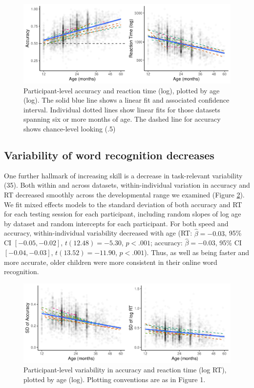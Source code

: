 \documentclass[9pt,twocolumn,twoside,]{pnas-new}
\begin{document}
\begin{figure}
\includegraphics{paper_files/figure-latex/devchange-1} \caption{Participant-level accuracy and reaction time (log), plotted by age (log). The solid blue line shows a linear fit and associated confidence interval. Individual dotted lines show linear fits for those datasets spanning six or more months of age. The dashed line for accuracy shows chance-level looking (.5)}\label{fig:devchange}
\end{figure}

\subsection*{Variability of word recognition
decreases}\label{variability-of-word-recognition-decreases}

One further hallmark of increasing skill is a decrease in task-relevant
variability (35). Both within and across datasets, within-individual
variation in accuracy and RT decreased smoothly across the developmental
range we examined (Figure \ref{fig:variance}). We fit mixed effects
models to the standard deviation of both accuracy and RT for each
testing session for each participant, including random slopes of log age
by dataset and random intercepts for each participant. For both speed
and accuracy, within-individual variability decreased with age (RT:
\(\hat{\beta} = -0.03\), 95\% CI \([-0.05, -0.02]\),
\(t(12.48) = -5.30\), \(p < .001\); accuracy: \(\hat{\beta} = -0.03\),
95\% CI \([-0.04, -0.03]\), \(t(13.52) = -11.90\), \(p < .001\)). Thus,
as well as being faster and more accurate, older children were more
consistent in their online word recognition.

\begin{figure}
\includegraphics{paper_files/figure-latex/variance-1} \caption{Participant-level variability in accuracy and reaction time (log RT), plotted by age (log). Plotting conventions are as in Figure 1.}\label{fig:variance}
\end{figure}
\end{document}
